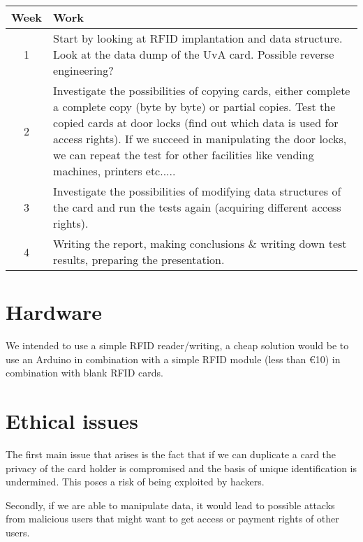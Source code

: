 \documentclass[11pt]{article}
\begin{document}
\begin{center}
\begin{tabular}{ | c | m{12cm}|  } 
\hline
Week& Work \\ 
\hline
1 & Start by looking at RFID implantation and data structure. Look at the data dump of the UvA card. Possible reverse engineering?  \\ 
\hline
2 & Investigate the possibilities of copying cards, either complete a complete copy (byte by byte) or partial copies. Test the copied cards at door locks (find out which data is used for access rights). If we succeed in manipulating the door locks, we can repeat the test for other facilities like vending machines, printers etc.....  \\ 
\hline
3 & Investigate the possibilities of modifying data structures of the card and run the tests again (acquiring different access rights). \\ 
\hline
4 & Writing the report, making conclusions \& writing down test results, preparing the presentation. \\
\hline

\end{tabular}
\end{center}




\section{Hardware}
We intended to use a simple RFID reader/writing, a cheap solution would be to use an Arduino in combination with a simple RFID module (less than \euro{10}) in combination with blank RFID cards. 



\section{Ethical issues}
The first main issue that arises is the fact that if we can duplicate a card the privacy of the card holder is compromised and the basis of unique identification is undermined. This poses a risk of being exploited by hackers. 

Secondly, if we are able to manipulate data, it would lead to possible attacks from malicious users that might want to get access or payment rights of other users. 
\end{document}

